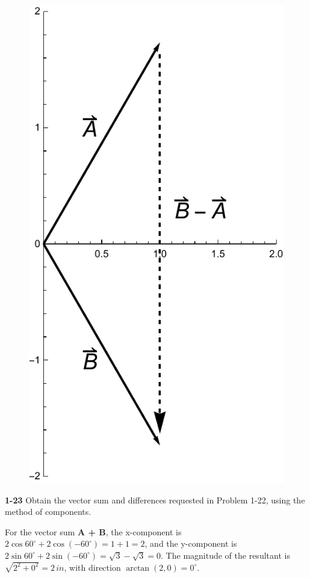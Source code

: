 \documentclass{amsart}
\begin{document}
\begin{figure}[h]
\begin{minipage}[c]{0.4\textwidth}
    \includegraphics[scale=0.32]{1-22d}
  \end{minipage}
\end{figure}

\textbf{1-23} Obtain the vector sum and differences requested in Problem 1-22, using the method of components.

For the vector sum \textbf{A + B}, the x-component is $2 \cos 60^\circ + 2 \cos (-60^\circ) = 1 + 1 = 2$,
and the y-component is $2 \sin 60^\circ + 2 \sin (-60^\circ) = \sqrt{3} - \sqrt{3} = 0$.
The magnitude of the resultant is $\sqrt{2^2 + 0^2} = 2\,in$, with direction $\arctan(2,0) = 0^\circ$.
\end{document}
